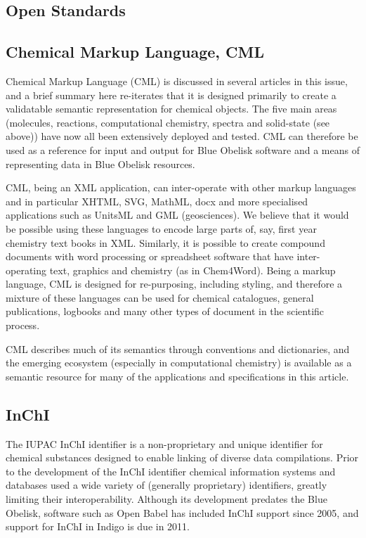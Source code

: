 \documentclass[10pt]{bmc_article}
\newenvironment{bmcformat}{\begin{raggedright}\baselineskip20pt\sloppy\setboolean{publ}{false}}{\end{raggedright}\baselineskip20pt\sloppy}
\begin{document}
\begin{bmcformat}
\section*{Open Standards}

\subsection*{Chemical Markup Language, CML}

Chemical Markup Language (CML) is discussed in several articles in this
issue, and a brief summary here re-iterates that it is designed
primarily to create a validatable semantic representation for chemical
objects. The five main areas (molecules, reactions, computational
chemistry, spectra and solid-state (see above)) have now all been
extensively deployed and tested. CML can therefore be used as a
reference for input and output for Blue Obelisk software and a means
of representing data in Blue Obelisk resources.

CML, being an XML application, can inter-operate with other markup
languages and in particular XHTML, SVG, MathML, docx and more
specialised applications such as UnitsML and GML (geosciences). We
believe that it would be possible using these languages to encode
large parts of, say, first year chemistry text books in XML.
Similarly, it is possible to create compound documents with word
processing or spreadsheet software that have inter-operating text,
graphics and chemistry (as in Chem4Word). Being a markup language, CML
is designed for re-purposing, including styling, and therefore a
mixture of these languages can be used for chemical catalogues,
general publications, logbooks and many other types of document in the
scientific process.

CML describes much of its semantics through conventions and
dictionaries, and the emerging ecosystem (especially in computational
chemistry) is available as a semantic resource for many of the
applications and specifications in this article.


  \subsection*{InChI}

The IUPAC InChI identifier is a non-proprietary and unique identifier
for chemical substances designed to enable linking of diverse data
compilations. Prior to the development of the InChI identifier chemical
information systems and databases used a wide variety of (generally
proprietary) identifiers, greatly limiting their interoperability.
Although its development predates the Blue Obelisk, software such as Open
Babel has included InChI support since 2005, and support for InChI in
Indigo is due in 2011.


\end{bmcformat}
\end{document}
